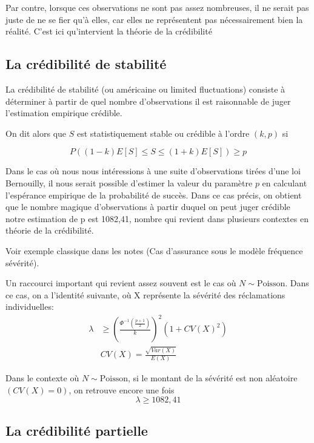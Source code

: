 \documentclass[11pt,french]{report}
\begin{document}
Par contre, lorsque ces observations ne sont pas assez nombreuses, il ne serait pas juste de ne se fier qu'à elles, car elles ne représentent pas nécessairement bien la réalité. C'est ici qu'intervient la théorie de la crédibilité

\subsection{La crédibilité de stabilité} 

La crédibilité  de stabilité (ou américaine ou limited fluctuations) consiste à déterminer à partir de quel nombre d'observations il est raisonnable de juger l'estimation empirique crédible.

On dit alors que $S$ est statistiquement stable ou crédible à l'ordre $(k,p)$ si

$$\boxed{P((1-k)E[S]\le S \le (1+k)E[S]) \ge p}$$

Dans le cas où nous nous intéressions à une suite d'observations tirées d'une loi Bernouilly, il nous serait possible d'estimer la valeur du paramètre $p$ en calculant l'espérance empirique de la probabilité de succès. Dans ce cas précis, on obtient que le nombre magique d'observations à partir duquel on peut juger crédible notre estimation de p est 1082,41, nombre qui revient dans plusieurs contextes en théorie de la crédibilité.

Voir exemple classique dans les notes (Cas d'assurance sous le modèle fréquence sévérité).

Un raccourci important qui revient assez souvent est le cas où $N \sim \text{Poisson}$. Dans ce cas, on a l'identité suivante, où X représente la sévérité des réclamations individuelles:
$$\boxed{\begin{aligned}
\lambda &\ge \left( \frac{\Phi^{-1}\left(\frac{p+1}{2}\right)}{k} \right)^2\left(1+ CV(X)^2 \right) \\
&CV(X) = \frac{\sqrt{Var(X)}}{E(X)}
\end{aligned}}$$

Dans le contexte où $N \sim \text{Poisson}$, si le montant de la sévérité est non aléatoire $(CV(X)=0)$, on retrouve encore une fois
$$\lambda \ge 1082,41$$

\subsection{La crédibilité partielle}
\end{document}
